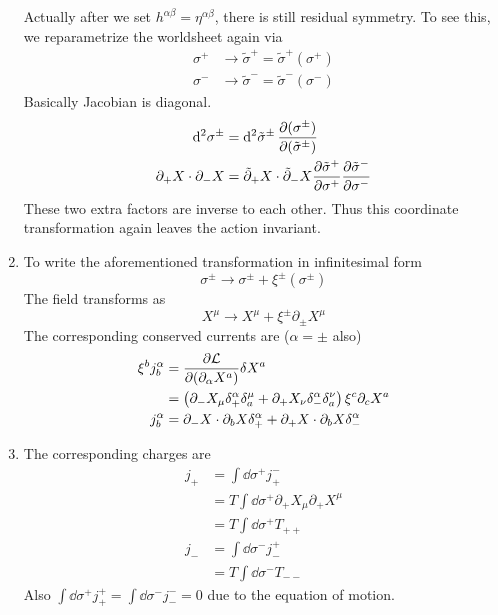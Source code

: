 \begin{enumerate}[label=(\alph*)]
		Actually after we set $h^{\alpha\beta}=\eta^{\alpha\beta}$, there is still residual symmetry. To see this, we reparametrize the worldsheet again via 
		\begin{align}
			\sigma^+ &\rightarrow \tilde{\sigma}^+ = \tilde{\sigma}^+(\sigma^+) \\
			\sigma^- &\rightarrow \tilde{\sigma}^- = \tilde{\sigma}^- (\sigma^-)
		\end{align}
		Basically Jacobian is diagonal. 
		\begin{align*}
			\dd[2]{\sigma^\pm} &= \dd[2]{\tilde{\sigma}^{\pm}} \pdv{(\sigma^\pm)}{(\tilde{\sigma}^\pm)} \\
			\partial_+ X \cdot \partial_- X &= \tilde\partial_+ X \cdot \tilde\partial_- X \pdv{\tilde{\sigma}^+}{\sigma^+} \pdv{\tilde{\sigma}^-}{\sigma^-}
		\end{align*}
		These two extra factors are inverse to each other. Thus this coordinate transformation again leaves the action invariant.


	\item 
		To write the aforementioned transformation in infinitesimal form
		\begin{equation*}
			\sigma^\pm \rightarrow \sigma^\pm + \xi^\pm(\sigma^\pm)
		\end{equation*}
		The field transforms as
		\begin{equation*}
			X^\mu \rightarrow X^\mu + \xi^\pm \partial_\pm X^\mu
		\end{equation*}
		The corresponding conserved currents are ($\alpha = \pm$ also)
		\begin{align*}
			\xi^b j_b^\alpha &= \pdv{\mathcal{L}}{(\partial_\alpha X^a)} \delta X^a \\
								  &= \left( \partial_- X_\mu \delta^\alpha_+ \delta^\mu_a + \partial_+ X_\nu \delta^\alpha_- \delta^\nu_a \right) \xi^c \partial_c X^a \\
									j_b^\alpha &= \partial_- X \cdot \partial_b X \delta^\alpha_+ + \partial_+ X \cdot \partial_b X \delta^\alpha_-
		\end{align*}

	\item The corresponding charges are
		\begin{align*}
			j_{+} &= \int \dd{\sigma^+} j_{+}^- \\
					  &=T \int \dd{\sigma^+} \partial_+ X_\mu \partial_+ X^\mu \\
					  &= T\int \dd{\sigma^+} T_{++} \\
			j_{-} &= \int \dd{\sigma^-} j_{-}^+ \\
					&= T \int\dd{\sigma^-} T_{--}
		\end{align*}
		Also $\int\dd{\sigma^+} j^+_+ = \int \dd{\sigma^-} j^-_- = 0$ due to the equation of motion.


\end{enumerate}
